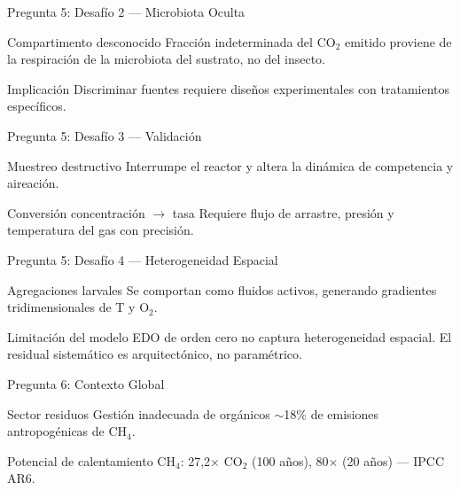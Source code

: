 \documentclass[aspectratio=169, 11pt]{beamer}
\begin{document}
\begin{frame}{Pregunta 5: Desafío 2 --- Microbiota Oculta}
\begin{alertblock}{Compartimento desconocido}
\footnotesize
Fracción indeterminada del CO$_2$ emitido proviene de la respiración de la microbiota del sustrato, no del insecto.
\end{alertblock}
\begin{block}{Implicación}
\footnotesize
Discriminar fuentes requiere diseños experimentales con tratamientos específicos.
\end{block}
\end{frame}

\begin{frame}{Pregunta 5: Desafío 3 --- Validación}
\begin{alertblock}{Muestreo destructivo}
\footnotesize
Interrumpe el reactor y altera la dinámica de competencia y aireación.
\end{alertblock}
\begin{block}{Conversión concentración $\rightarrow$ tasa}
\footnotesize
Requiere flujo de arrastre, presión y temperatura del gas con precisión.
\end{block}
\end{frame}

\begin{frame}{Pregunta 5: Desafío 4 --- Heterogeneidad Espacial}
\begin{alertblock}{Agregaciones larvales}
\footnotesize
Se comportan como fluidos activos, generando gradientes tridimensionales de T y O$_2$.
\end{alertblock}
\begin{block}{Limitación del modelo}
\footnotesize
EDO de orden cero no captura heterogeneidad espacial. El residual sistemático es arquitectónico, no paramétrico.
\end{block}
\end{frame}

\begin{frame}{Pregunta 6: Contexto Global}
\begin{block}{Sector residuos}
\footnotesize
Gestión inadecuada de orgánicos $\sim$18\% de emisiones antropogénicas de CH$_4$.
\end{block}
\begin{alertblock}{Potencial de calentamiento}
\footnotesize
CH$_4$: 27,2$\times$ CO$_2$ (100 años), 80$\times$ (20 años) --- IPCC AR6.
\end{alertblock}
\end{frame}
\end{document}
